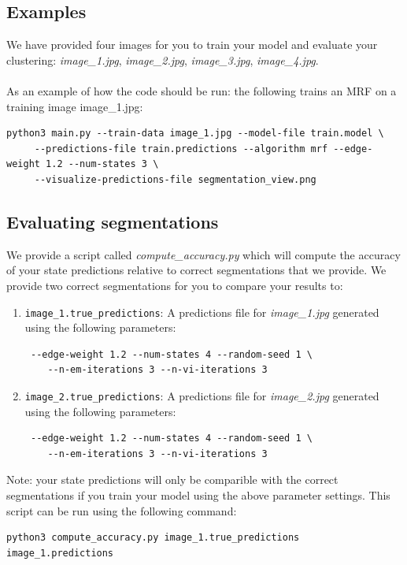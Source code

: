 \documentclass[11pt]{article}
\begin{document}
\subsection{Examples}
We have provided four images for you to train your model and evaluate your clustering: \textit{image\_1.jpg}, \textit{image\_2.jpg}, \textit{image\_3.jpg}, \textit{image\_4.jpg}. \\\\
As an example of how the code should be run: the following trains an MRF on a training image image\_1.jpg:
\begin{footnotesize}
\begin{verbatim}
python3 main.py --train-data image_1.jpg --model-file train.model \
     --predictions-file train.predictions --algorithm mrf --edge-weight 1.2 --num-states 3 \
     --visualize-predictions-file segmentation_view.png
\end{verbatim}
\end{footnotesize}

\subsection{Evaluating segmentations}

We provide a script called \textit{compute\_accuracy.py} which will compute the accuracy of your state predictions relative to correct segmentations that we provide. We provide two correct segmentations for you to compare your results to:
\begin{enumerate}
    \item {\tt image\_1.true\_predictions}: A predictions file for \textit{image\_1.jpg} generated using the following parameters:\begin{verbatim} --edge-weight 1.2 --num-states 4 --random-seed 1 \ 
    --n-em-iterations 3 --n-vi-iterations 3
    \end{verbatim}
    \item {\tt image\_2.true\_predictions}: A predictions file for \textit{image\_2.jpg} generated using the following parameters:\begin{verbatim} --edge-weight 1.2 --num-states 4 --random-seed 1 \ 
    --n-em-iterations 3 --n-vi-iterations 3
    \end{verbatim}
\end{enumerate}

Note: your state predictions will only be comparible with the correct segmentations if you train your model using the above parameter settings. This script can be run using the following command:\\
\begin{footnotesize}
\begin{verbatim}
python3 compute_accuracy.py image_1.true_predictions image_1.predictions
\end{verbatim}
\end{footnotesize}
\end{document}
